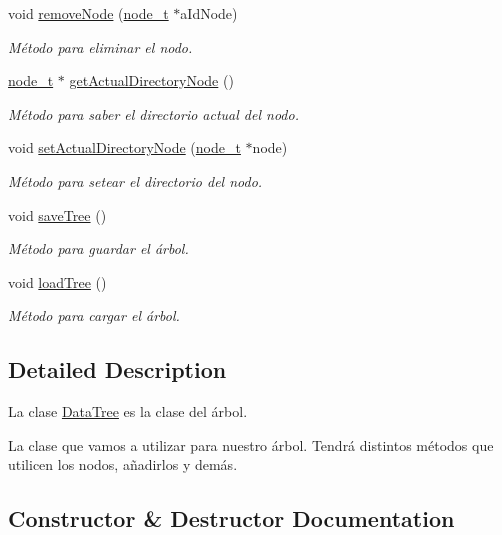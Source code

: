 \begin{DoxyCompactItemize}
void \hyperlink{classDataTree_ad5cf54ba01f825be5feb7c4a9c42a1ae}{remove\+Node} (\hyperlink{structnode__t}{node\+\_\+t} $\ast$a\+Id\+Node)
\begin{DoxyCompactList}\small\item\em Método para eliminar el nodo. \end{DoxyCompactList}\item 
\hyperlink{structnode__t}{node\+\_\+t} $\ast$ \hyperlink{classDataTree_a65a382929fed2fe66ec7b245eba4700d}{get\+Actual\+Directory\+Node} ()
\begin{DoxyCompactList}\small\item\em Método para saber el directorio actual del nodo. \end{DoxyCompactList}\item 
void \hyperlink{classDataTree_a24e9d2aac27bf64c33708e94ddf2c429}{set\+Actual\+Directory\+Node} (\hyperlink{structnode__t}{node\+\_\+t} $\ast$node)
\begin{DoxyCompactList}\small\item\em Método para setear el directorio del nodo. \end{DoxyCompactList}\item 
void \hyperlink{classDataTree_ad82644547c535fa1802e166efb211a88}{save\+Tree} ()
\begin{DoxyCompactList}\small\item\em Método para guardar el árbol. \end{DoxyCompactList}\item 
void \hyperlink{classDataTree_ade69ae1d6b9c9c0b61abcb397fef1484}{load\+Tree} ()
\begin{DoxyCompactList}\small\item\em Método para cargar el árbol. \end{DoxyCompactList}\end{DoxyCompactItemize}


\subsection{Detailed Description}
La clase \hyperlink{classDataTree}{Data\+Tree} es la clase del árbol. 

La clase que vamos a utilizar para nuestro árbol. Tendrá distintos métodos que utilicen los nodos, añadirlos y demás. 

\subsection{Constructor \& Destructor Documentation}
\mbox{\label{classDataTree_ad15b4598b9fe62c07ac85ef08e9f0d3e}} 
